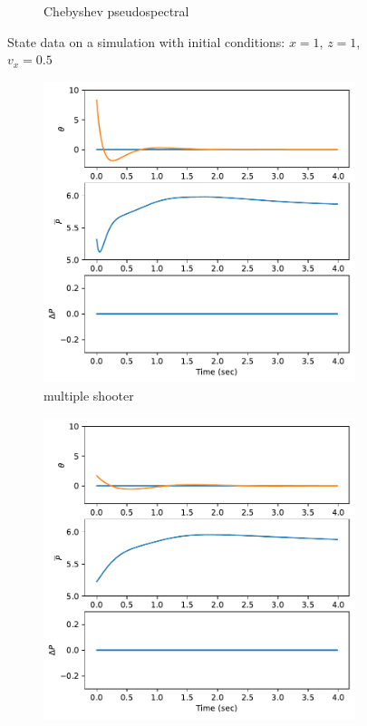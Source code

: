 \documentclass[]{article}
\begin{document}
\begin{figure}[H]
\begin{subfigure}[b]{0.3\textwidth}
		\caption{Chebyshev pseudospectral}
	\end{subfigure}
	\caption{State data on a simulation with initial conditions: $x = 1$, $z=1$, $v_x = 0.5$ }
	\label{fig:statex1z1vx}
\end{figure}

\begin{figure}[H]
	\centering
	\begin{subfigure}[b]{0.3\textwidth}
		\centering
		\includegraphics[width=\textwidth]{figures/controlx1z1vx6.pdf}
		\caption{multiple shooter}
	\end{subfigure}
	\begin{subfigure}[b]{0.3\textwidth}
		\centering
		\includegraphics[width=\textwidth]{figures/controlx1z1vx4.pdf}

\end{subfigure}
\end{figure}
\end{document}
